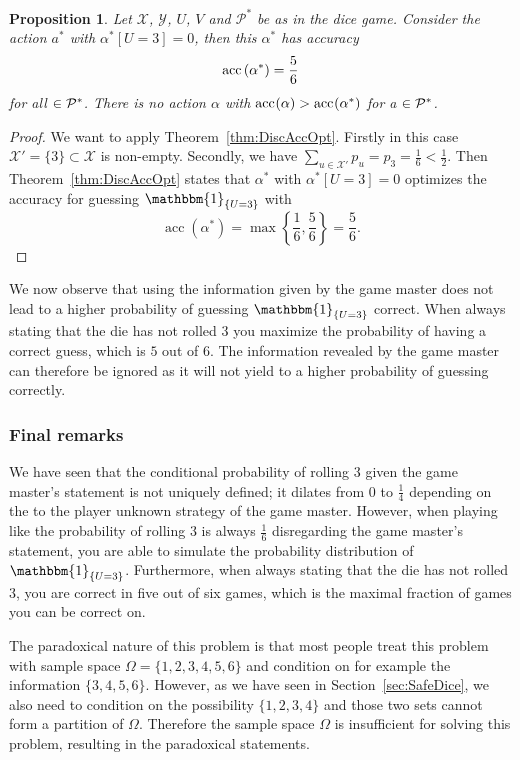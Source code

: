 \documentclass[a4paper]{report}
\theoremstyle{plain}
\newtheorem{proposition}[theorem]{Proposition}
\theoremstyle{definition}
\theoremstyle{remark}
\numberwithin{equation}{chapter}
\let\P\relax
\DeclareMathOperator{\P}{\mathbb{P}}
\DeclareMathOperator{\1}{\mathbbm{1}}
\newcommand{\X}{\mathcal{X}}
\newcommand{\Y}{\mathcal{Y}}
\DeclareMathOperator{\acc}{acc}
\newcommand{\Pmod}{\mathcal{P}^*}
\newcommand{\DieInd}{\1_{\{U=3\}}}
\begin{document}
\begin{proposition}
Let $\X$, $\Y$, $U$, $V$ and $\Pmod$ be as in the dice game. Consider the action $a^*$ with $\alpha^*[U=3]=0$, then this $\alpha^*$ has accuracy
\begin{equation}
\acc^{\P}\left(\alpha^*\right)=\frac{5}{6}
\end{equation}
for all $\P\in\Pmod$. There is no action $\alpha$ with $\acc^{\P}(\alpha)>\acc^{\P}(\alpha^*)$ for a $\P\in\Pmod$.
\end{proposition}
\begin{proof}
We want to apply Theorem~\ref{thm:DiscAccOpt}. Firstly in this case $\X'=\{3\}\subset\X$ is non-empty. Secondly, we have $\sum_{u\in\X'}p_u=p_3=\frac{1}{6}<\frac{1}{2}$. Then Theorem~\ref{thm:DiscAccOpt} states that $\alpha^*$ with $\alpha^*[U=3]=0$ optimizes the accuracy for guessing $\DieInd$ with
\begin{equation}
\acc\left(\alpha^*\right)=\max\left\{\frac{1}{6},\frac{5}{6}\right\}=\frac{5}{6}.
\end{equation}
\end{proof}


We now observe that using the information given by the game master does not lead to a higher probability of guessing $\DieInd$ correct. When always stating that the die has not rolled $3$ you maximize the probability of having a correct guess, which is $5$ out of $6$. The information revealed by the game master can therefore be ignored as it will not yield to a higher probability of guessing correctly.

\subsubsection{Final remarks}
We have seen that the conditional probability of rolling $3$ given the game master's statement is not uniquely defined; it dilates from $0$ to $\frac{1}{4}$ depending on the to the player unknown strategy of the game master. However, when playing like the probability of rolling $3$ is always $\frac{1}{6}$ disregarding the game master's statement, you are able to simulate the probability distribution of $\DieInd$. Furthermore, when always stating that the die has not rolled $3$, you are correct in five out of six games, which is the maximal fraction of games you can be correct on.

The paradoxical nature of this problem is that most people treat this problem with sample space $\Omega=\{1,2,3,4,5,6\}$ and condition on for example the information $\{3,4,5,6\}$. However, as we have seen in Section~\ref{sec:SafeDice}, we also need to condition on the possibility $\{1,2,3,4\}$ and those two sets cannot form a partition of $\Omega$. Therefore the sample space $\Omega$ is insufficient for solving this problem, resulting in the paradoxical statements.
\end{document}
